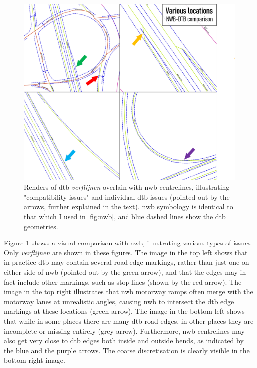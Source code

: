 \begin{figure}
    \centering
    \includegraphics[width=\linewidth]{final_report/figs/dtb_sample_07.png} 
    \caption[Renders of DTB road edges overlain with NWB, illustrating various issues]{Renders of \ac{dtb} \textit{verflijnen} overlain with \ac{nwb} centrelines, illustrating "compatibility issues" and individual \ac{dtb} issues (pointed out by the arrows, further explained in the text). \ac{nwb} symbology is identical to that which I used in \ref{fig:nwb}, and blue dashed lines show the \ac{dtb} geometries.}
    \label{fig:dtbnwb}
\end{figure}

Figure \ref{fig:dtbnwb} shows a visual comparison with \ac{nwb}, illustrating various types of issues. Only \textit{verflijnen} are shown in these figures. The image in the top left shows that in practice \ac{dtb} may contain several road edge markings, rather than just one on either side of \ac{nwb} (pointed out by the green arrow), and that the edges may in fact include other markings, such as stop lines (shown by the red arrow). The image in the top right illustrates that \ac{nwb} motorway ramps often merge with the motorway lanes at unrealistic angles, causing \ac{nwb} to intersect the \ac{dtb} edge markings at these locations (green arrow). The image in the bottom left shows that while in some places there are many \ac{dtb} road edges, in other places they are incomplete or missing entirely (grey arrow). Furthermore, \ac{nwb} centrelines may also get very close to \ac{dtb} edges both inside and outside bends, as indicated by the blue and the purple arrows. The coarse discretisation is clearly visible in the bottom right image.

